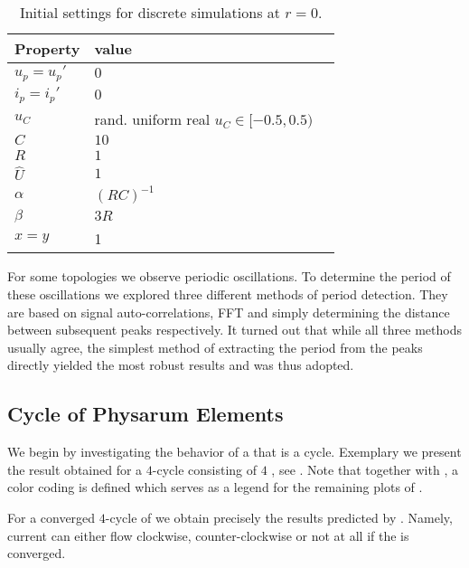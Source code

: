 	\begin{table}
        \centering
        \begin{tabular}{@{} l *2l @{}}
        \toprule
         \multicolumn{1}{c}{Property}    & value  \\ 
        \midrule
         $u_p = u_p'$ & $0$   \\ 
         $i_p = i_p'$ & $0$   \\ 
         $u_C$ & rand. uniform real $u_C \in [ -0.5 , 0.5 )$   \\ 
         $C$ & $10$ \\
         $R$ & $1$ \\
         $\hat{U}$ & $1$ \\
         $\alpha$ & $(R C)^{-1}$ \\
         $\beta$ & $3 R$ \\
         $x = y$ & 1 \\
        \bottomrule
        \end{tabular}
        \caption[Simulation - Initial values]{Initial settings for discrete simulations at $r=0$.}
        \label{tab:initialization}
     \end{table}

     For some topologies we observe periodic oscillations. To determine the period of these oscillations we explored three different methods of period detection. They are based on signal auto-correlations, FFT and simply determining the distance between subsequent peaks respectively. It turned out that while all three methods usually agree, the simplest method of extracting the period from the peaks directly yielded the most robust results and was thus adopted.

    \newpage
	\subsection{Cycle of Physarum Elements}

		We begin by investigating the behavior of a \Pn that is a cycle. Exemplary we present the result obtained for a $4$-cycle consisting of $4$ \Pes, see . Note that together with , a color coding is defined which serves as a legend for the remaining plots of .

		For a converged $4$-cycle of \Pes we obtain precisely the results predicted by . Namely, current can either flow clockwise, counter-clockwise or not at all if the \Pn is converged. 

